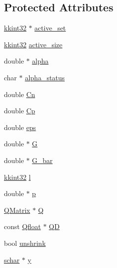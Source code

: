 \subsection*{Protected Attributes}
\begin{DoxyCompactItemize}
\item 
\hyperlink{namespace_k_k_b_a8fa4952cc84fda1de4bec1fbdd8d5b1b}{kkint32} $\ast$ \hyperlink{class_s_v_m289___b_f_s_1_1_solver_a30bc70bcd35e337c114d4565cbc5d19f}{active\+\_\+set}
\item 
\hyperlink{namespace_k_k_b_a8fa4952cc84fda1de4bec1fbdd8d5b1b}{kkint32} \hyperlink{class_s_v_m289___b_f_s_1_1_solver_a602b406f795ec9054a09d9a1ef23a8c6}{active\+\_\+size}
\item 
double $\ast$ \hyperlink{class_s_v_m289___b_f_s_1_1_solver_a8a95f4c9f0b029661c53d858534c0408}{alpha}
\item 
char $\ast$ \hyperlink{class_s_v_m289___b_f_s_1_1_solver_ac02e702c2d611adf01940d51cf204ecd}{alpha\+\_\+status}
\item 
double \hyperlink{class_s_v_m289___b_f_s_1_1_solver_ad0dd3ddc87834e0b9dbe7d2132a440ea}{Cn}
\item 
double \hyperlink{class_s_v_m289___b_f_s_1_1_solver_a7bae981240155350227523f2bd08ee87}{Cp}
\item 
double \hyperlink{class_s_v_m289___b_f_s_1_1_solver_abb1bb8ca9d36e39da8cc535b4b49b57c}{eps}
\item 
double $\ast$ \hyperlink{class_s_v_m289___b_f_s_1_1_solver_a23dd808efd06b7ef3a97c54b0c3c8824}{G}
\item 
double $\ast$ \hyperlink{class_s_v_m289___b_f_s_1_1_solver_a81ba66cfcf5abb112056da0e56fce551}{G\+\_\+bar}
\item 
\hyperlink{namespace_k_k_b_a8fa4952cc84fda1de4bec1fbdd8d5b1b}{kkint32} \hyperlink{class_s_v_m289___b_f_s_1_1_solver_af63e60689ab3dd865e76e2c1d35db148}{l}
\item 
double $\ast$ \hyperlink{class_s_v_m289___b_f_s_1_1_solver_a4c3032a9c43561e743ba7a807ab1c1c7}{p}
\item 
\hyperlink{class_s_v_m289___b_f_s_1_1_q_matrix}{Q\+Matrix} $\ast$ \hyperlink{class_s_v_m289___b_f_s_1_1_solver_ae0494fb6f65df63e46d76059ef07e3ec}{Q}
\item 
const \hyperlink{namespace_s_v_m289___b_f_s_a8b0a7657dcefcb6e9a857c9b5e2fd2ef}{Qfloat} $\ast$ \hyperlink{class_s_v_m289___b_f_s_1_1_solver_a28e141b65ab370ba3cfad591f1060b5a}{QD}
\item 
bool \hyperlink{class_s_v_m289___b_f_s_1_1_solver_aacbfb24e4ebd24d420e89d1f216102be}{unshrink}
\item 
\hyperlink{namespace_s_v_m289___b_f_s_a67b51ac46a91cdb7ad72dea9fad6c0f0}{schar} $\ast$ \hyperlink{class_s_v_m289___b_f_s_1_1_solver_ab6e1027acd321351163e02445ac37a48}{y}
\end{DoxyCompactItemize}


